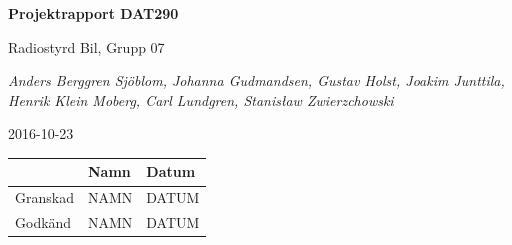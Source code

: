 \documentclass[a4paper]{article}
\begin{document}
\begin{titlepage}
\centering
{\bfseries\huge Projektrapport DAT290}

\vspace{10mm}

{\Large Radiostyrd Bil, Grupp 07}

\vspace{20mm}

{\Large \itshape{Anders Berggren Sjöblom, Johanna Gudmandsen, Gustav Holst, Joakim Junttila, Henrik Klein Moberg, Carl Lundgren, Stanisław Zwierzchowski}}

\vspace{10mm}

{2016-10-23}


\normalsize{
\begin{table}[b]
\centering
\begin{tabular}{|l|l|l|}  \hline
         & \bf Namn & \bf Datum   \\ \hline \hline
Granskad & NAMN     & DATUM        \\ \hline
Godkänd  & NAMN     & DATUM         \\ \hline
\end{tabular} 
\end{table}}
\end{titlepage}

\tableofcontents
\end{document}
